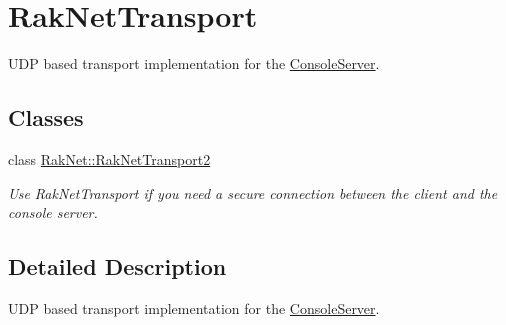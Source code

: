 \hypertarget{group___r_a_k_n_e_t___t_r_a_n_s_p_o_r_t___g_r_o_u_p}{\section{Rak\-Net\-Transport}
\label{group___r_a_k_n_e_t___t_r_a_n_s_p_o_r_t___g_r_o_u_p}
}


U\-D\-P based transport implementation for the \hyperlink{class_rak_net_1_1_console_server}{Console\-Server}.  


\subsection*{Classes}
\begin{DoxyCompactItemize}
\item 
class \hyperlink{class_rak_net_1_1_rak_net_transport2}{Rak\-Net\-::\-Rak\-Net\-Transport2}
\begin{DoxyCompactList}\small\item\em Use Rak\-Net\-Transport if you need a secure connection between the client and the console server. \end{DoxyCompactList}\end{DoxyCompactItemize}


\subsection{Detailed Description}
U\-D\-P based transport implementation for the \hyperlink{class_rak_net_1_1_console_server}{Console\-Server}. 